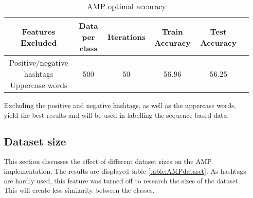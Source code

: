 \begin{table}[h!]
\begin{center}
\begin{tabular}{| c | c | c | c | c | c |}
\hline
 {\textbf{Features Excluded}} 	 
 & {\textbf{Data per class}} 					& {\textbf{Iterations}} 
 & {\textbf{Train Accuracy}} 					& {\textbf{Test Accuracy}} 
 \\
\hline
\parbox[t]{3cm}{Positive/negative hashtags \\Uppercase words}	&	500	&	50	&	56.96	& 	56.25	\\
\hline
\end{tabular}
\caption{AMP optimal accuracy}
\label{table:AMPoptimal}
\end{center}
\end{table}

Excluding the positive and negative hashtags, as well as the uppercase words, yield the best results and will be used in labelling the sequence-based data.

\begin{comment}
Tests show that some of the features are not meaningful enough and including them in the set of used features only decreases the performance. Furthermore, the Average Multiclass Perceptron was also used further in this project in a scenario where the data does not contain any hashtags. Thus, in table \ref{table:AMPfeatures}, results are shown for two different feature sets. The first one, denoted as `all', contains all features discussed in section \ref{sec:features}.
The second one, denoted in table \ref{table:AMPaccuracy} as `subset', is a subset of all features, which does not contain hashtag-related features \red{and maybe the uppercase words since ubuntu data does not contain much of them? shall we try also without it}.
\end{comment}

\subsection{Dataset size}
This section discusses the effect of different dataset sizes on the AMP implementation. The results are displayed table \ref{table:AMPdataset}. As hashtags are hardly used, this feature was turned off to research the sizes of the dataset. This will create less similarity between the classes.

